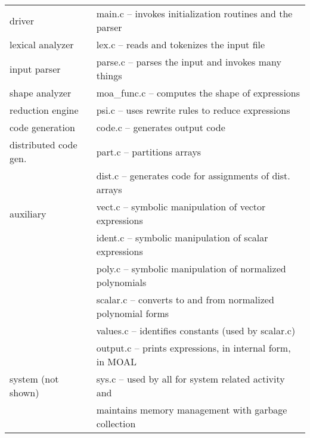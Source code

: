 \begin{tabular}{ll}
driver & main.c -- invokes initialization routines and the parser \\
lexical analyzer & lex.c -- reads and tokenizes the input file \\
input parser & parse.c -- parses the input and invokes many things \\
shape analyzer & moa\_func.c -- computes the shape of expressions \\
reduction engine & psi.c -- uses rewrite rules to reduce expressions \\
code generation & code.c -- generates output code \\
distributed code gen. & part.c -- partitions arrays \\
 & dist.c -- generates code for assignments of dist. arrays \\
auxiliary & vect.c -- symbolic manipulation of vector expressions \\
 & ident.c -- symbolic manipulation of scalar expressions \\
 & poly.c -- symbolic manipulation of normalized polynomials \\
 & scalar.c -- converts to and from normalized polynomial forms \\
 & values.c -- identifies constants (used by scalar.c) \\
 & output.c -- prints expressions, in internal form, in MOAL \\
system (not shown) & sys.c -- used by all for system related activity and \\
 & maintains memory management with garbage collection \\
\end{tabular}

